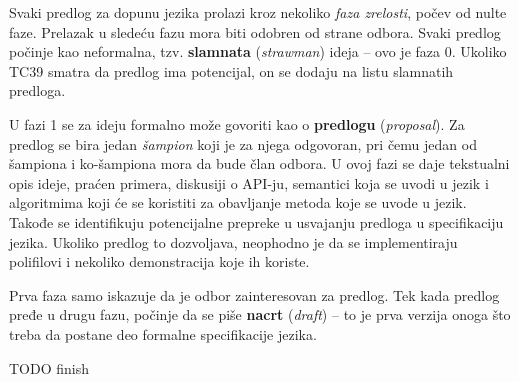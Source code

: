 Svaki predlog za dopunu jezika prolazi kroz nekoliko \textit{faza zrelosti}, počev od nulte faze.
Prelazak u sledeću fazu mora biti odobren od strane odbora.
Svaki predlog počinje kao neformalna, tzv. \textbf{slamnata} (\textsl{strawman}) ideja -- ovo je faza 0.
Ukoliko TC39 smatra da predlog ima potencijal, on se dodaju na listu slamnatih predloga.

U fazi 1 se za ideju formalno može govoriti kao o \textbf{predlogu} (\textsl{proposal}). 
Za predlog se bira jedan \textit{šampion} koji je za njega odgovoran, pri čemu jedan od šampiona i ko-šampiona mora da bude član odbora.
U ovoj fazi se daje tekstualni opis ideje, praćen primera, diskusiji o API-ju, semantici koja se uvodi u jezik i algoritmima koji će se koristiti za obavljanje metoda koje se uvode u jezik.
Takođe se identifikuju potencijalne prepreke u usvajanju predloga u specifikaciju jezika.
Ukoliko predlog to dozvoljava, neophodno je da se implementiraju polifilovi i nekoliko demonstracija koje ih koriste.

Prva faza samo iskazuje da je odbor zainteresovan za predlog.
Tek kada predlog pređe u drugu fazu, počinje da se piše \textbf{nacrt} (\textsl{draft}) -- to je prva verzija onoga što treba da postane deo formalne specifikacije jezika.

TODO finish
